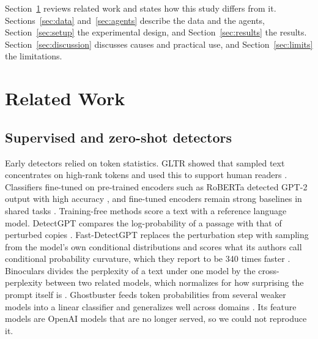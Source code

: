 \documentclass[journal]{IEEEtran}
\begin{document}
Section~\ref{sec:related} reviews related work and states how this study differs from it.
Sections~\ref{sec:data} and~\ref{sec:agents} describe the data and the agents, Section~\ref{sec:setup} the
experimental design, and Section~\ref{sec:results} the results. Section~\ref{sec:discussion} discusses causes and
practical use, and Section~\ref{sec:limits} the limitations.

\section{Related Work}\label{sec:related}
\subsection{Supervised and zero-shot detectors}
Early detectors relied on token statistics. GLTR showed that sampled text concentrates on high-rank tokens and used
this to support human readers \cite{Gehrmann_2019}. Classifiers fine-tuned on pre-trained encoders such as RoBERTa
\cite{Liu_2019} detected GPT-2 output with high accuracy \cite{Solaiman_2019}, and fine-tuned encoders remain strong
baselines in shared tasks \cite{Wang_SemEval_2024}. Training-free methods score a text with a reference language
model. DetectGPT compares the log-probability of a passage with that of perturbed copies \cite{Mitchell_2023}.
Fast-DetectGPT replaces the perturbation step with sampling from the model's own conditional distributions and
scores what its authors call conditional probability curvature, which they report to be 340 times faster
\cite{Bao_2024}. Binoculars divides the perplexity of a text under one model by the cross-perplexity between two
related models, which normalizes for how surprising the prompt itself is \cite{Hans_2024}. Ghostbuster feeds token
probabilities from several weaker models into a linear classifier and generalizes well across domains
\cite{Verma_2024}. Its feature models are OpenAI models that are no longer served, so we could not reproduce it.
\end{document}
